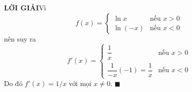 \begin{minipage}[t]{0.705\textwidth}
  \vspace{5pt}
  \noindent\textbf{\textsf{\color{stewartcyan}LỜI GIẢI}}\quad Vì
  \[
    f(x) = \begin{cases}
      \ln x & \text{nếu } x > 0 \\[2pt]
      \ln(-x) & \text{nếu } x < 0
    \end{cases}
  \]
  nên suy ra
  \[
    f'(x) = \begin{cases}
      \dfrac{1}{x} & \text{nếu } x > 0 \\[10pt]
      \dfrac{1}{-x}(-1) = \dfrac{1}{x} & \text{nếu } x < 0
    \end{cases}
  \]
  Do đó $f'(x) = 1/x$ với mọi $x \ne 0$. \hfill {\color{stewartcyan}$\blacksquare$}
\end{minipage}
